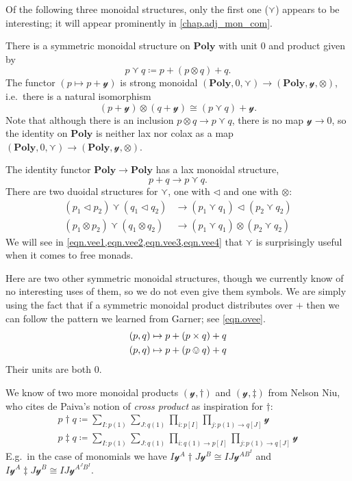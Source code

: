 \documentclass[11pt, one side, article]{memoir}
\theoremstyle{definition}
\theoremstyle{plain}
\newcommand{\Cat}[1]{\mathbf{#1}}%
\newcommand{\yon}{{\mathcal{y}}}
\newcommand{\poly}{\Cat{Poly}}
\newcommand{\0}{\textsf{0}}
\newcommand{\1}{\tn{\textsf{1}}}
\newcommand{\tri}{\mathbin{\triangleleft}}
\begin{document}
Of the following three monoidal structures, only the first one ($\curlyvee$) appears to be interesting; it will appear prominently in \cref{chap.adj_mon_com}.

There is a symmetric monoidal structure on $\poly$ with unit $0$ and product given by
\begin{equation}\label{eqn.vee}
  p\curlyvee q\coloneqq p+(p\otimes q)+q.
\end{equation}
The functor $(p\mapsto p+\yon)$ is strong monoidal $(\poly,0,\curlyvee)\to(\poly,\yon,\otimes)$, i.e.\ there is a natural isomorphism
\begin{equation}
	(p+\yon)\otimes(q+\yon)\cong (p\curlyvee q)+\yon.
\end{equation}
Note that although there is an inclusion $p\otimes q\to p\curlyvee q$, there is no map $\yon\to0$, so the identity on $\poly$ is neither lax nor colax as a map $(\poly,0,\curlyvee)\to(\poly,\yon,\otimes)$.

The identity functor $\poly\to\poly$ has a lax monoidal structure,
\begin{equation}
	p+q\to p\curlyvee q.
\end{equation}
There are two duoidal structures for $\curlyvee$, one with $\tri$ and one with $\otimes$:
\begin{align*}
	(p_1\tri p_2)\curlyvee(q_1\tri q_2)&\to(p_1\curlyvee q_1)\tri(p_2\curlyvee q_2)\\
	(p_1\otimes p_2)\curlyvee(q_1\otimes q_2)&\to(p_1\curlyvee q_1)\otimes(p_2\curlyvee q_2)
\end{align*}
We will see in \cref{eqn.vee1,eqn.vee2,eqn.vee3,eqn.vee4} that $\curlyvee$ is surprisingly useful when it comes to free monads.

Here are two other symmetric monoidal structures, though we currently know of no interesting uses of them, so we do not even give them symbols. We are simply using the fact that if a symmetric monoidal product distributes over $+$ then we can follow the pattern we learned from Garner; see \eqref{eqn.ovee}.
\begin{align}
	(p,q)&\mapsto p+(p\times q)+q\\
	(p,q)&\mapsto p+(p\ovee q)+q
\end{align}
Their units are both $0$. 

We know of two more monoidal products $(\yon,\dagger)$ and $(\yon, \ddagger)$ from Nelson Niu, who cites de Paiva's notion of \emph{cross product} as inspiration for $\dagger$:
\begin{align}
	p\dagger q\coloneqq\sum_{I: p(1)}\sum_{J: q(1)}\prod_{i: p[I]}\prod_{j\colon p(1)\to q[J]}\yon\\
	p\ddagger q\coloneqq\sum_{I: p(1)}\sum_{J: q(1)}\prod_{i\colon q(1)\to p[I]}\prod_{j\colon p(1)\to q[J]}\yon
\end{align}
E.g.\ in the case of monomials we have $I\yon^A\dagger J\yon^B\cong IJ\yon^{AB^I}$ and $I\yon^A\ddagger J\yon^B\cong IJ\yon^{A^JB^I}$.
\end{document}
